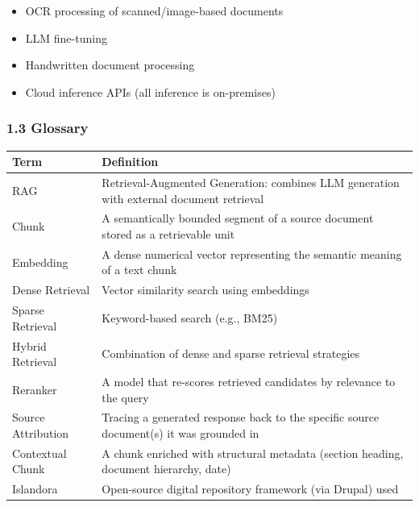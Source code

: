 \documentclass[
  11pt,
]{article}
\newcounter{none} %
\providecommand{\tightlist}{%
  \setlength{\itemsep}{0pt}\setlength{\parskip}{0pt}}
\begin{document}
\begin{itemize}
\tightlist
\item
  OCR processing of scanned/image-based documents
\item
  LLM fine-tuning
\item
  Handwritten document processing
\item
  Cloud inference APIs (all inference is on-premises)
\end{itemize}

\subsubsection{1.3 Glossary}\label{glossary}

{\def\LTcaptype{none} %
\begin{longtable}[]{@{}
  >{\raggedright\arraybackslash}p{}
  >{\raggedright\arraybackslash}p{}@{}}
\toprule\noalign{}
\begin{minipage}[b]{\linewidth}\raggedright
Term
\end{minipage} & \begin{minipage}[b]{\linewidth}\raggedright
Definition
\end{minipage} \\
\midrule\noalign{}
\endhead
\bottomrule\noalign{}
\endlastfoot
RAG & Retrieval-Augmented Generation: combines LLM generation with
external document retrieval \\
Chunk & A semantically bounded segment of a source document stored as a
retrievable unit \\
Embedding & A dense numerical vector representing the semantic meaning
of a text chunk \\
Dense Retrieval & Vector similarity search using embeddings \\
Sparse Retrieval & Keyword-based search (e.g., BM25) \\
Hybrid Retrieval & Combination of dense and sparse retrieval
strategies \\
Reranker & A model that re-scores retrieved candidates by relevance to
the query \\
Source Attribution & Tracing a generated response back to the specific
source document(s) it was grounded in \\
Contextual Chunk & A chunk enriched with structural metadata (section
heading, document hierarchy, date) \\
Islandora & Open-source digital repository framework (via Drupal) used

\end{longtable}}
\end{document}
